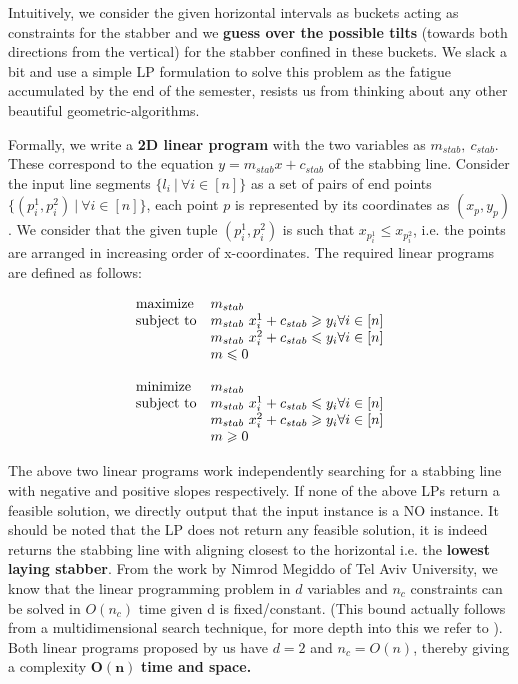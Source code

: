 Intuitively, we consider the given horizontal intervals as buckets acting as constraints for the stabber and we \textbf{guess over the possible tilts} (towards both directions from the vertical) for the stabber confined in these buckets. We slack a bit and use a simple LP formulation to solve this problem as the fatigue accumulated by the end of the semester, resists us from thinking about any other beautiful geometric-algorithms.

Formally, we write a \textbf{2D linear program} with the two variables as $m_{stab},\ c_{stab}$. These correspond to the equation $y=m_{stab}x+c_{stab}$ of the stabbing line. Consider the input line segments $\{l_i\ |\ \forall i \in [n]\}$ as a set of pairs of end points $\{(p^1_i, p^2_i)\ | \ \forall i\in [n]\}$, each point $p$ is represented by its coordinates as $(x_p, y_p)$. We consider that the given tuple $(p^1_i, p^2_i)$ is such that $x_{p^1_i}\leq x_{p^2_i}$, i.e. the points are arranged in increasing order of x-coordinates. The required linear programs are defined as follows:

\begin{equation*}
\begin{array}{ll@{}ll}
\text{maximize}  &  m_{stab} &\\
\text{subject to}& m_{stab}\ x^1_i + c_{stab}\geq y_i &\forall i \in [n]\\
    & m_{stab}\ x^2_i  + c_{stab} \leq y_i &\forall i \in [n]\\
    & m\leq 0
\end{array}
\end{equation*}


\begin{equation*}
\begin{array}{ll@{}ll}
\text{minimize}  &  m_{stab} &\\
\text{subject to}& m_{stab}\ x^1_i + c_{stab}\leq y_i &\forall i \in [n]\\
    & m_{stab}\ x^2_i  + c_{stab} \geq y_i &\forall i \in [n]\\
    & m\geq 0
\end{array}
\end{equation*}

The above two linear programs work independently searching for a stabbing line with negative and positive slopes respectively.  If none of the above LPs return a feasible solution, we directly output that the input instance is a NO instance. It should be noted that the LP does not return any feasible solution, it is indeed returns the stabbing line with aligning closest to the horizontal i.e. the \textbf{lowest laying stabber}. From the work \cite{megiddo1984linear} by Nimrod Megiddo of Tel Aviv University, we know that the linear programming problem in $d$ variables and $n_c$ constraints can
be solved in $O(n_c)$ time given d is fixed/constant. (This bound actually follows from a multidimensional search technique, for more depth into this we refer to \cite{megiddo1984linear}). Both linear programs proposed by us have $d=2$ and $n_c =O(n)$, thereby giving a complexity $\bm{O(n)}$ \textbf{time and space.}

